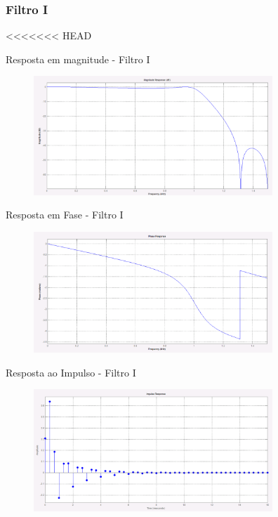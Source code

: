 \documentclass{beamer}
\begin{document}
\subsubsection{Filtro I}
<<<<<<< HEAD
	\begin{frame}{Resposta em magnitude - Filtro I}
		\begin{figure}[ht]
			\centering
			\includegraphics[width=9cm]{../pictures/Filtro1/RespMagnitudeFiltro1.png}
			\label{fig:magnitude1}
		\end{figure}
	\end{frame}
	\begin{frame}{Resposta em Fase - Filtro I}
		\begin{figure}[ht]
			\centering
			\includegraphics[width=9cm]{../pictures/Filtro1/RespFaseFiltro1.png}
			\label{fig:magnitude1}
		\end{figure}
	\end{frame}
	\begin{frame}{Resposta ao Impulso - Filtro I}
		\begin{figure}[ht]
			\centering
			\includegraphics[width=9cm]{../pictures/Filtro1/RespImpulsoFiltro1.png}
			\label{fig:magnitude1}
		\end{figure}
	\end{frame}
\end{document}
